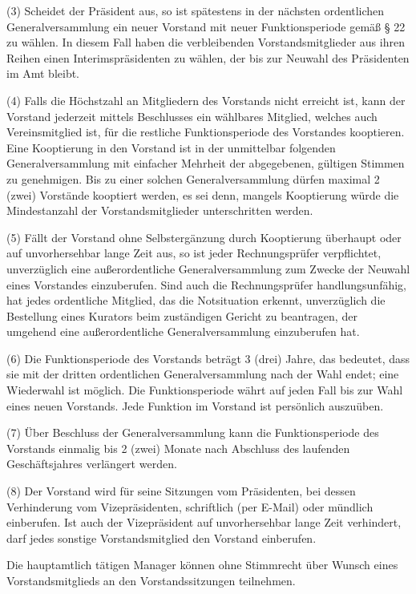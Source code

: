 \documentclass[11pt,a4paper]{article}
\begin{document}
(3)
Scheidet der Präsident aus, so ist spätestens in der nächsten ordentlichen Generalversammlung ein neuer Vorstand mit neuer Funktionsperiode gemäß § 22 zu wählen.
In diesem Fall haben die verbleibenden Vorstandsmitglieder aus ihren Reihen einen Interimspräsidenten zu wählen, der bis zur Neuwahl des Präsidenten im Amt bleibt.

(4)
Falls die Höchstzahl an Mitgliedern des Vorstands nicht erreicht ist, kann der Vorstand jederzeit mittels Beschlusses ein wählbares Mitglied, welches auch Vereinsmitglied ist, für die restliche Funktionsperiode des Vorstandes kooptieren.
Eine Kooptierung in den Vorstand ist in der unmittelbar folgenden Generalversammlung mit einfacher Mehrheit der abgegebenen, gültigen Stimmen zu genehmigen.
Bis zu einer solchen Generalversammlung dürfen maximal 2 (zwei) Vorstände kooptiert werden, es sei denn, mangels Kooptierung würde die Mindestanzahl der Vorstandsmitglieder unterschritten werden.

(5)
Fällt der Vorstand ohne Selbstergänzung durch Kooptierung überhaupt oder auf unvorhersehbar lange Zeit aus, so ist jeder Rechnungsprüfer verpflichtet, unverzüglich eine außerordentliche Generalversammlung zum Zwecke der Neuwahl eines Vorstandes einzuberufen.
Sind auch die Rechnungsprüfer handlungsunfähig, hat jedes ordentliche Mitglied, das die Notsituation erkennt, unverzüglich die Bestellung eines Kurators beim zuständigen Gericht zu beantragen, der umgehend eine außerordentliche Generalversammlung einzuberufen hat.

(6)
Die Funktionsperiode des Vorstands beträgt 3 (drei) Jahre, das bedeutet, dass sie mit der dritten ordentlichen Generalversammlung nach der Wahl endet; eine Wiederwahl ist möglich.
Die Funktionsperiode währt auf jeden Fall bis zur Wahl eines neuen Vorstands.
Jede Funktion im Vorstand ist persönlich auszuüben.

(7)
Über Beschluss der Generalversammlung kann die Funktionsperiode des Vorstands einmalig bis 2 (zwei) Monate nach Abschluss des laufenden Geschäftsjahres verlängert werden.

(8)
Der Vorstand wird für seine Sitzungen vom Präsidenten, bei dessen Verhinderung vom Vizepräsidenten, schriftlich (per E-Mail) oder mündlich einberufen.
Ist auch der Vizepräsident auf unvorhersehbar lange Zeit verhindert, darf jedes sonstige Vorstandsmitglied den Vorstand einberufen.

Die hauptamtlich tätigen Manager können ohne Stimmrecht über Wunsch eines Vorstandsmitglieds an den Vorstandssitzungen teilnehmen.
\end{document}
